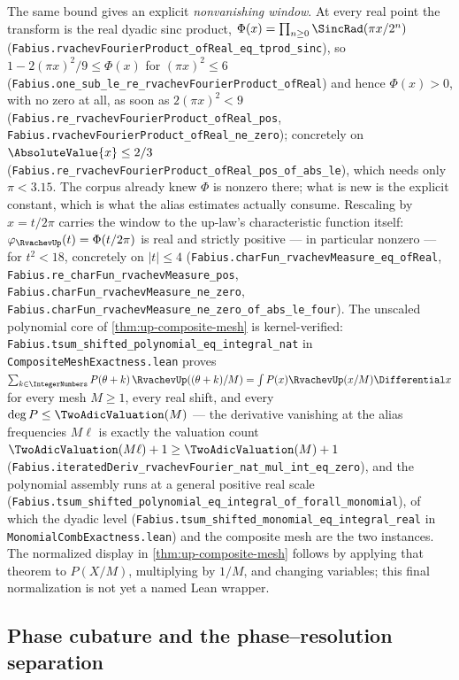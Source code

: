 The same bound gives an explicit \emph{nonvanishing window}.  At every real point the
transform is the real dyadic sinc product,
\(\Phi(x)=\prod_{n\ge0}\SincRad(\pi x/2^n)\)
(\nolinkurl{Fabius.rvachevFourierProduct_ofReal_eq_tprod_sinc}), so
\(1-2(\pi x)^2/9\le\Phi(x)\) for \((\pi x)^2\le6\)
(\nolinkurl{Fabius.one_sub_le_re_rvachevFourierProduct_ofReal}) and hence \(\Phi(x)>0\),
with no zero at all, as soon as \(2(\pi x)^2<9\)
(\nolinkurl{Fabius.re_rvachevFourierProduct_ofReal_pos},
\nolinkurl{Fabius.rvachevFourierProduct_ofReal_ne_zero}); concretely on \(\AbsoluteValue{x}\le2/3\)
(\nolinkurl{Fabius.re_rvachevFourierProduct_ofReal_pos_of_abs_le}), which needs only
\(\pi<3.15\).  The corpus already knew \(\Phi\) is nonzero there; what is new is the
explicit constant, which is what the alias estimates actually consume.
Rescaling by \(x=t/2\pi\) carries the window to the up-law's characteristic function
itself: \(\varphi_{\RvachevUp}(t)=\Phi(t/2\pi)\) is real and strictly positive --- in particular nonzero ---
for \(t^2<18\), concretely on \(\lvert t\rvert\le4\)
(\nolinkurl{Fabius.charFun_rvachevMeasure_eq_ofReal},
\nolinkurl{Fabius.re_charFun_rvachevMeasure_pos},
\nolinkurl{Fabius.charFun_rvachevMeasure_ne_zero},
\nolinkurl{Fabius.charFun_rvachevMeasure_ne_zero_of_abs_le_four}).
The unscaled polynomial core of \cref{thm:up-composite-mesh} is kernel-verified:
\nolinkurl{Fabius.tsum_shifted_polynomial_eq_integral_nat} in
\nolinkurl{CompositeMeshExactness.lean} proves
\(\sum_{k\in\IntegerNumbers}P(\theta+k)\,\RvachevUp((\theta+k)/M)=\int P(x)\RvachevUp(x/M)\Differential x\) for every mesh
\(M\ge1\), every real shift, and every \(\deg P\le\TwoAdicValuation(M)\) --- the derivative
vanishing at the alias frequencies \(M\ell\) is exactly the valuation count
\(\TwoAdicValuation(M\ell)+1\ge\TwoAdicValuation(M)+1\) (\nolinkurl{Fabius.iteratedDeriv_rvachevFourier_nat_mul_int_eq_zero}),
and the polynomial assembly runs at a general positive real scale
(\nolinkurl{Fabius.tsum_shifted_polynomial_eq_integral_of_forall_monomial}), of which the
dyadic level (\nolinkurl{Fabius.tsum_shifted_monomial_eq_integral_real} in
\nolinkurl{MonomialCombExactness.lean}) and the composite mesh are the two instances.
The normalized display in \cref{thm:up-composite-mesh} follows by applying that theorem
to $P(X/M)$, multiplying by $1/M$, and changing variables; this final normalization is
not yet a named Lean wrapper.

\subsection{Phase cubature and the phase--resolution separation}


